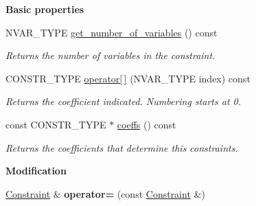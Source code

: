 \begin{Indent}\textbf{ Basic properties}\par
\begin{DoxyCompactItemize}
\item 
\mbox{\label{group___c_l_s_solvers_a10b3789ede36e0b614fb76fbe0248476}} 
N\+V\+A\+R\+\_\+\+T\+Y\+PE \hyperlink{group___c_l_s_solvers_a10b3789ede36e0b614fb76fbe0248476}{get\+\_\+number\+\_\+of\+\_\+variables} () const
\begin{DoxyCompactList}\small\item\em Returns the number of variables in the constraint. \end{DoxyCompactList}\item 
\mbox{\label{group___c_l_s_solvers_a286fb7825aa45114478110e17bef1ccc}} 
C\+O\+N\+S\+T\+R\+\_\+\+T\+Y\+PE \hyperlink{group___c_l_s_solvers_a286fb7825aa45114478110e17bef1ccc}{operator\mbox{[}$\,$\mbox{]}} (N\+V\+A\+R\+\_\+\+T\+Y\+PE index) const
\begin{DoxyCompactList}\small\item\em Returns the coefficient indicated. Numbering starts at 0. \end{DoxyCompactList}\item 
\mbox{\label{group___c_l_s_solvers_a4e6dd23c317ce6865167b30d1d75de19}} 
const C\+O\+N\+S\+T\+R\+\_\+\+T\+Y\+PE $\ast$ \hyperlink{group___c_l_s_solvers_a4e6dd23c317ce6865167b30d1d75de19}{coeffs} () const
\begin{DoxyCompactList}\small\item\em Returns the coefficients that determine this constraints. \end{DoxyCompactList}\end{DoxyCompactItemize}
\end{Indent}
\begin{Indent}\textbf{ Modification}\par
\begin{DoxyCompactItemize}
\item 
\mbox{\label{group___c_l_s_solvers_a7040b1a4ebddf3deb58b22219904d43e}} 
\hyperlink{group___c_l_s_solvers_class_l_p___solvers_1_1_constraint}{Constraint} \& {\bfseries operator=} (const \hyperlink{group___c_l_s_solvers_class_l_p___solvers_1_1_constraint}{Constraint} \&)
\end{DoxyCompactItemize}
\end{Indent}
